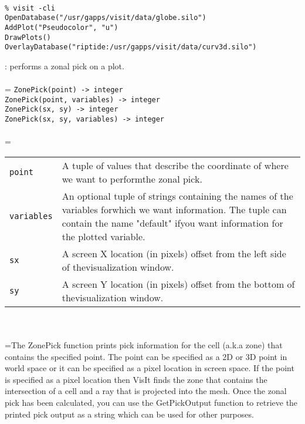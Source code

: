\documentclass[10pt,a4paper]{report}
\begin{document}
\\[-6mm]
\begin{verbatim}% visit -cli
OpenDatabase("/usr/gapps/visit/data/globe.silo")
AddPlot("Pseudocolor", "u")
DrawPlots()
OverlayDatabase("riptide:/usr/gapps/visit/data/curv3d.silo")
\end{verbatim}
\newpage


{}
: performs a zonal pick on a plot.\\[-3mm]

 \\ 
\hangindent=\parindent 
\verb!ZonePick(point) -> integer!\\ 
\verb!ZonePick(point, variables) -> integer!\\ 
\verb!ZonePick(sx, sy) -> integer!\\ 
\verb!ZonePick(sx, sy, variables) -> integer!\\ [-3mm]

 \\ 
\hangindent=\parindent 
\begin{tabular}{lp{9cm}}
\verb!point! & A tuple of values that describe the coordinate of where we want to performthe zonal pick. \\
\verb!variables! & An optional tuple of strings containing the names of the variables forwhich we want information. The tuple can contain the name "default" ifyou want information for the plotted variable. \\
\verb!sx! & A screen X location (in pixels) offset from the left side of thevisualization window. \\
\verb!sy! & A screen Y location (in pixels) offset from the bottom of thevisualization window. \\
\end{tabular} \\[-2mm]


 \\ 
\hangindent=\parindent The ZonePick function prints pick information for the cell (a.k.a zone) that contains the specified point. The point can be specified as a 2D or 3D point in world space or it can be specified as a pixel location in screen space. If the point is specified as a pixel location then VisIt finds the zone that contains the intersection of a cell and a ray that is projected into the mesh. Once the zonal pick has been calculated, you can use the GetPickOutput function to retrieve the printed pick output as a string which can be used for other purposes. \\[-3mm] 
\end{document}
